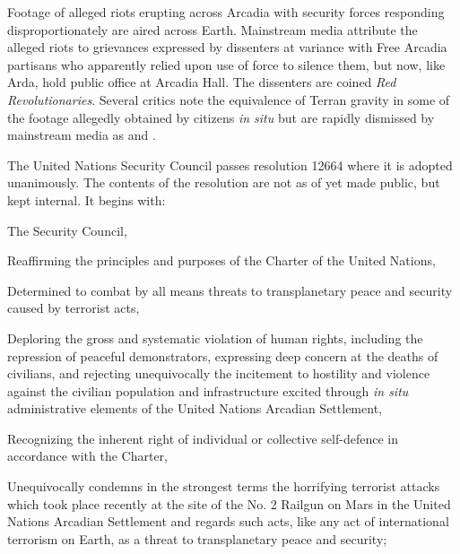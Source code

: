 

Footage of alleged riots erupting across Arcadia with security forces responding disproportionately are aired across Earth. Mainstream media attribute the alleged riots to grievances expressed by dissenters at variance with Free Arcadia partisans who apparently relied upon use of force to silence them, but now, like Arda, hold public office at Arcadia Hall. The dissenters are coined {\it Red Revolutionaries}. Several critics note the equivalence of Terran gravity in some of the footage allegedly obtained by citizens {\it in situ} but are rapidly dismissed by mainstream media as  and .
\StopTimelineDate

The United Nations Security Council passes resolution 12664 where it is adopted unanimously. The contents of the resolution are not as of yet made public, but kept internal. It begins with:

\startTimelineGeneralDocument
The Security Council,

Reaffirming the principles and purposes of the Charter of the United Nations,

Determined to combat by all means threats to transplanetary peace and security caused by terrorist acts,

Deploring the gross and systematic violation of human rights, including the repression of peaceful demonstrators, expressing deep concern at the deaths of civilians, and rejecting unequivocally the incitement to hostility and violence against the civilian population and infrastructure excited through {\it in situ} administrative elements of the United Nations Arcadian Settlement,

Recognizing the inherent right of individual or collective self-defence in accordance with the Charter,

\startitemize[n]
\setupwhitespace[big]
\item Unequivocally condemns in the strongest terms the horrifying terrorist attacks which took place recently at the site of the No. \type{#}2 Railgun on Mars in the United Nations Arcadian Settlement and regards such acts, like any act of international terrorism on Earth, as a threat to transplanetary peace and security;

